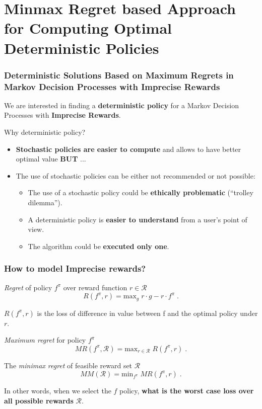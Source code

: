 \documentclass{beamer}
\begin{document}
\section{Minmax Regret based Approach for Computing Optimal Deterministic Policies}


\begin{frame}
\frametitle{Deterministic Solutions Based on Maximum Regrets in Markov Decision Processes with Imprecise Rewards}

We are interested in finding a \textbf{deterministic policy} for a Markov Decision Processes with \textbf{Imprecise Rewards}.

\begin{block}{Why deterministic policy?}
\begin{itemize}
\item \textbf{Stochastic policies are easier to compute} and allows to have better optimal value \textbf{BUT} ...
\item The use of stochastic policies can be either not recommended or not possible:
\begin{itemize}
\item The use of a stochastic policy could be \textbf{ethically problematic} (``trolley dilemma'').
\item A deterministic policy is \textbf{easier to understand} from a user's point of view. 
\item The algorithm could be \textbf{executed only one}.
\end{itemize}
\end{itemize}
\end{block}

\end{frame}


\begin{frame}
\frametitle{How to model Imprecise rewards?}
\begin{block}{\textit{Regret} of policy $f^{\pi}$ over reward function $r \in \mathcal{R}$}
$$R(f^{\pi}, r) = \text{max}_{g} \; r \cdot g - r \cdot f^{\pi}\;.$$

$R(f^{\pi}, r)$ is the loss of difference in value between f and the optimal policy under $r$. 
\end{block}

\begin{block}{\textit{Maximum regret} for policy $f^{\pi}$}
$$MR(f^{\pi}, \mathcal{R}) = \text{max}_{r \in \mathcal{R}}\;R(f^{\pi},r)\;.$$
\end{block}

\begin{block}{The \textit{minimax regret} of feasible reward set $\mathcal{R}$}
$$MM(\mathcal{R}) = \text{min}_{f^{\pi}}\; MR(f^{\pi}, r)\;.$$
\end{block}

In other words, when we select the $f$ policy, \textbf{what is the worst case loss over all possible rewards} $\mathcal{R}$. 


\end{frame}
\end{document}
